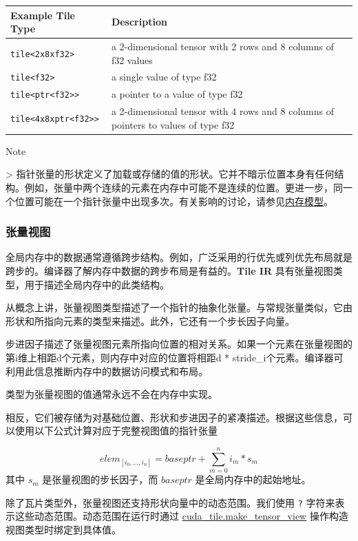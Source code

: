 \documentclass{article}
\begin{document}
\begin{longtable}{l|l}
\hline
Example Tile Type & Description \\ \hline
\texttt{tile<2x8xf32>} & a 2-dimensional tensor with 2 rows and 8 columns of f32 values \\ \hline
\texttt{tile<f32>} & a single value of type f32 \\ \hline
\texttt{tile<ptr<f32>>} & a pointer to a value of type f32 \\ \hline
\texttt{tile<4x8xptr<f32>>} & a 2-dimensional tensor with 4 rows and 8 columns of pointers to values of type f32 \\ \hline
\end{longtable}


Note

> 指针张量的形状定义了加载或存储的值的形状。它并不暗示位置本身有任何结构。例如，张量中两个连续的元素在内存中可能不是连续的位置。更进一步，同一个位置可能在一个指针张量中出现多次。有关影响的讨论，请参见\href{https://docs.nvidia.com/cuda/tile-ir/latest/sections/memory_model.html#section-memory-model}{内存模型}。



\subsubsection{张量视图}

全局内存中的数据通常遵循跨步结构。例如，广泛采用的行优先或列优先布局就是跨步的。编译器了解内存中数据的跨步布局是有益的。\textbf{Tile IR} 具有张量视图类型，用于描述全局内存中的此类结构。


从概念上讲，张量视图类型描述了一个指针的抽象化张量。与常规张量类似，它由形状和所指向元素的类型来描述。此外，它还有一个步长因子向量。


步进因子描述了张量视图元素所指向位置的相对关系。如果一个元素在张量视图的第i维上相距d个元素，则内存中对应的位置将相距d * stride\_i个元素。编译器可利用此信息推断内存中的数据访问模式和布局。


类型为张量视图的值通常永远不会在内存中实现。

相反，它们被存储为对基础位置、形状和步进因子的紧凑描述。根据这些信息，可以使用以下公式计算对应于完整视图值的指针张量

$$elem_{[i_0,\ldots,i_n]}=baseptr+\sum_{m=0}^n i_m * s_m$$
其中 $s_m$ 是张量视图的步长因子，而 $baseptr$ 是全局内存中的起始地址。


除了瓦片类型外，张量视图还支持形状向量中的动态范围。我们使用 \texttt{?} 字符来表示这些动态范围。动态范围在运行时通过 \href{https://docs.nvidia.com/cuda/tile-ir/latest/sections/operations.html#op-cuda-tile-make-tensor-view}{cuda\_tile.make\_tensor\_view} 操作构造视图类型时绑定到具体值。
\end{document}
